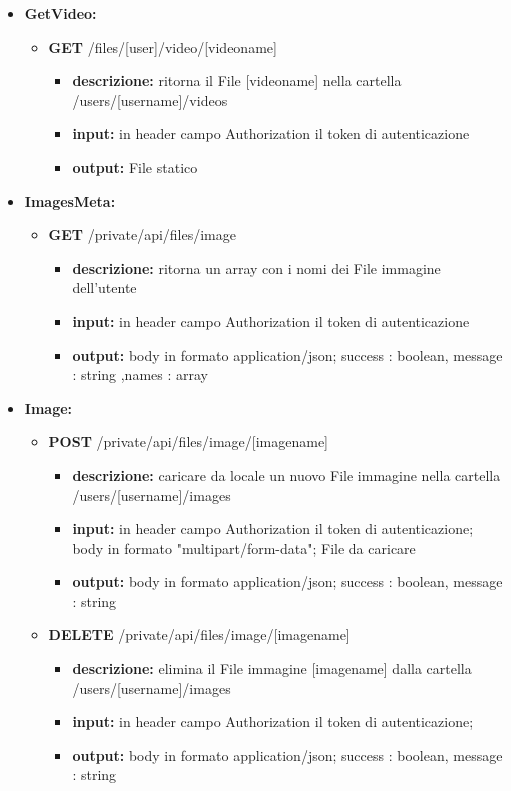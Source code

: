 {{\begin{itemize}
		\item \textbf{GetVideo:}
			\begin{itemize}
			\item    \textbf{GET} /files/[user]/video/[videoname]
				\begin{itemize} 
				\item \textbf{descrizione:} ritorna il File nella cartella /users/[username]/videos					\item \textbf{input:} in header campo Authorization il token di autenticazione
				\item \textbf{output:} File statico
				\end{itemize}
			\end{itemize}
			
			
		\item \textbf{ImagesMeta:}
			\begin{itemize}
			\item   \textbf{GET} /private/api/files/image 
				\begin{itemize} 
				\item \textbf{descrizione:} ritorna un array con i nomi dei File immagine dell'utente
				\item \textbf{input:} in header campo Authorization il token di autenticazione
				\item \textbf{output:} body in formato application/json; success : boolean, message : string ,names : array
				\end{itemize}
			\end{itemize}
			
		\item \textbf{Image:}
			\begin{itemize}
			\item    \textbf{POST} /private/api/files/image/[imagename]
				\begin{itemize} 
				\item \textbf{descrizione:} caricare da locale un nuovo File immagine nella cartella /users/[username]/images					
				\item \textbf{input:} in header campo Authorization il token di autenticazione; body in formato "multipart/form-data"; File da caricare
				\item \textbf{output:} body in formato application/json; success : boolean, message : string
				\end{itemize}
			\item   \textbf{DELETE} /private/api/files/image/[imagename]
				\begin{itemize} 
				\item \textbf{descrizione:} elimina il File immagine [imagename] dalla cartella /users/[username]/images			
				\item \textbf{input:} in header campo Authorization il token di autenticazione;
				\item \textbf{output:} body in formato application/json; success : boolean, message : string
				\end{itemize}
			\end{itemize}
			

\end{itemize}}}
